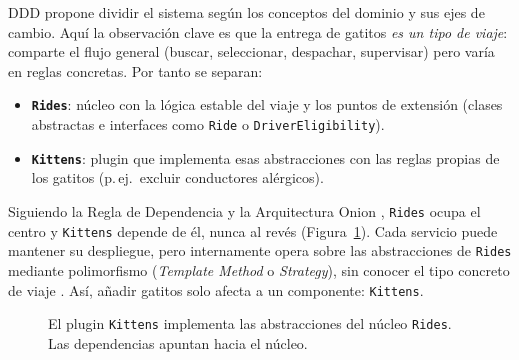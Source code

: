 \documentclass[11pt,a4paper]{article}
\begin{document}
DDD propone dividir el sistema según los conceptos del dominio y sus ejes de
cambio. Aquí la observación clave es que la entrega de gatitos \emph{es un tipo
de viaje}: comparte el flujo general (buscar, seleccionar, despachar,
supervisar) pero varía en reglas concretas. Por tanto se separan:

\begin{itemize}[nosep]
  \item \textbf{\texttt{Rides}}: núcleo con la lógica estable del viaje y los
        puntos de extensión (clases abstractas e interfaces como \texttt{Ride} o
        \texttt{DriverEligibility}).
  \item \textbf{\texttt{Kittens}}: plugin que implementa esas abstracciones con
        las reglas propias de los gatitos (p.\,ej.\ excluir conductores
        alérgicos).
\end{itemize}

Siguiendo la Regla de Dependencia \citep{martin2017} y la Arquitectura Onion
\citep{palermo2008}, \texttt{Rides} ocupa el centro y \texttt{Kittens} depende
de él, nunca al revés (Figura~\ref{fig:plugins}). Cada servicio puede mantener
su despliegue, pero internamente opera sobre las abstracciones de
\texttt{Rides} mediante polimorfismo (\textit{Template Method} o
\textit{Strategy}), sin conocer el tipo concreto de viaje \citep{martin2017}.
Así, añadir gatitos solo afecta a un componente: \texttt{Kittens}.

\begin{figure}[ht]
\centering
{}
\caption{El plugin \texttt{Kittens} implementa las abstracciones del núcleo
\texttt{Rides}. Las dependencias apuntan hacia el núcleo.}
\label{fig:plugins}
\end{figure}
\end{document}

